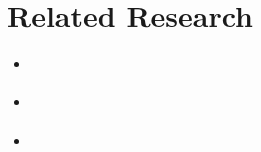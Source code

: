 \section{Related Research}
\begin{itemize}
	\item \cite{huberman_evolutionary_1993}
	\item \cite{a_framework_2008}
	\item \cite{botta_time_2010}
\end{itemize} 
